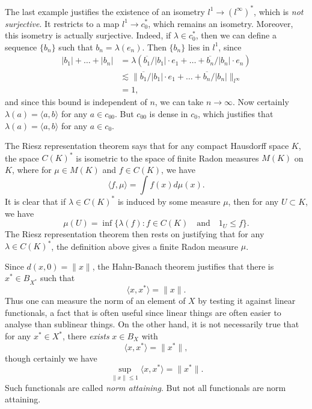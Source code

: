 \begin{example}
    The last example justifies the existence of an isometry $l^1 \to (l^\infty)^*$, which is \emph{not surjective}. It restricts to a map $l^1 \to c_0^*$, which remains an isometry. Moreover, this isometry is actually surjective. Indeed, if $\lambda \in c_0^*$, then we can define a sequence $\{ b_n \}$ such that $b_n = \lambda(e_n)$. Then $\{ b_n \}$ lies in $l^1$, since
    \begin{align*}
        |b_1| + \dots + |b_n| &= \lambda \left( \overline{b_1} / |b_1| \cdot e_1 + \dots + \overline{b_n} / |b_n| \cdot e_n \right)\\
        &\lesssim \| \overline{b_1} / |b_1| \cdot e_1 + \dots + \overline{b_n} / |b_n| \|_{l^\infty}\\
        &= 1,
    \end{align*}
    and since this bound is independent of $n$, we can take $n \to \infty$. Now certainly $\lambda(a) = \langle a, b \rangle$ for any $a \in c_{00}$. But $c_{00}$ is dense in $c_0$, which justifies that $\lambda(a) = \langle a, b \rangle$ for any $a \in c_0$.
\end{example}

\begin{example}
    The Riesz representation theorem says that for any compact Hausdorff space $K$, the space $C(K)^*$ is isometric to the space of finite Radon measures $M(K)$ on $K$, where for $\mu \in M(K)$ and $f \in C(K)$, we have
    \[ \langle f, \mu \rangle = \int f(x) d\mu(x). \]
    It is clear that if $\lambda \in C(K)^*$ is induced by some measure $\mu$, then for any $U \subset K$, we have
    \[ \mu(U) = \inf \{ \lambda(f): f \in C(K) \quad\text{and}\quad 1_U \leq f \}. \]
    The Riesz representation theorem then rests on justifying that for any $\lambda \in C(K)^*$, the definition above gives a finite Radon measure $\mu$.
\end{example}

Since $d(x,0) = \| x \|$, the Hahn-Banach theorem justifies that there is $x^* \in B_{X^*}$ such that
%
\[ \langle x, x^* \rangle = \| x \|. \]
%
Thus one can measure the norm of an element of $X$ by testing it against linear functionals, a fact that is often useful since linear things are often easier to analyse than sublinear things. On the other hand, it is not necessarily true that for any $x^* \in X^*$, there \emph{exists} $x \in B_X$ with
%
\[ \langle x, x^* \rangle = \| x^* \|, \]
%
though certainly we have
%
\[ \sup_{\| x \| \leq 1} \langle x, x^* \rangle = \| x^* \|. \]
%
Such functionals are called \emph{norm attaining}. But not all functionals are norm attaining.

